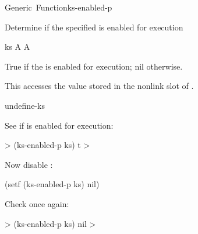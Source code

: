 \documentclass[10pt,twoside,english,pdftex]{article}
\begin{document}
\begin{functiondoc}{Generic~Function}{ks-enabled-p}{ 
    \returns{} }
%

\fnsyntax

\fnpurpose Determine if the specified  is enabled for
execution

\fnsetf
{}

\fnmethods
{}

\fnpackage {}

\fnmodule {}

\fnargs
\begin{args}{ks}
\arg[ks] A 
\arg[boolean] A 
\end{args}

\fnreturns True if the  is enabled for execution; nil otherwise.
  
\fndescription 
This  accesses the value stored in the 
 nonlink slot of .

\begin{alsos}{undefine-ks}
\also[define-ks]
\also[ks]
\also[undefine-ks]
\end{alsos}

\fnexamples
See if   is enabled for execution:
%
\W\supp
\begin{example}
  > (ks-enabled-p ks)
  t
  >
\end{example}
%
Now disable  :
%
\W\supp\notpretop
\begin{example}
  (setf (ks-enabled-p ks) nil)
\end{example}
%
Check once again:
%
\W\supp\notpretop
\begin{example}
  > (ks-enabled-p ks)
  nil
  >
\end{example}

\end{functiondoc}

\end{document}
